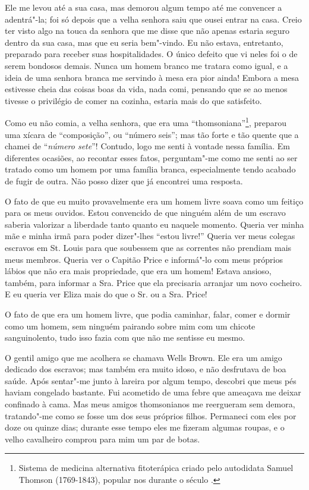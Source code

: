 Ele me levou até a sua casa, mas demorou algum tempo até me convencer a
adentrá"-la; foi só depois que a velha senhora saiu que ousei entrar na
casa. Creio ter visto algo na touca da senhora que me disse que não
apenas estaria seguro dentro da sua casa, mas que eu seria bem"-vindo. Eu
não estava, entretanto, preparado para receber suas hospitalidades. O
único defeito que vi neles foi o de serem bondosos demais. Nunca um
homem branco me tratara como igual, e a ideia de uma senhora branca me
servindo à mesa era pior ainda! Embora a mesa estivesse cheia das coisas
boas da vida, nada comi, pensando que se ao menos tivesse o privilégio
de comer na cozinha, estaria mais do que satisfeito.

Como eu não comia, a velha senhora, que era uma
``thomsoniana''\footnote{Sistema de medicina alternativa fitoterápica
  criado pelo autodidata Samuel Thomson (1769-1843), popular nos 
  durante o século .}, preparou uma xícara de ``composição'', ou
``número seis''; mas tão forte e tão quente que a chamei de
``\emph{número sete}''! Contudo, logo me senti à vontade nessa família.
Em diferentes ocasiões, ao recontar esses fatos, perguntam"-me como me
senti ao ser tratado como um homem por uma família branca, especialmente
tendo acabado de fugir de outra. Não posso dizer que já encontrei uma
resposta.

O fato de que eu muito provavelmente era um homem livre soava como um
feitiço para os meus ouvidos. Estou convencido de que ninguém além de um
escravo saberia valorizar a liberdade tanto quanto eu naquele momento.
Queria ver minha mãe e minha irmã para poder dizer"-lhes ``estou livre!''
Queria ver meus colegas escravos em St. Louis para que soubessem que as
correntes não prendiam mais meus membros. Queria ver o Capitão Price e
informá"-lo com meus próprios lábios que não era mais propriedade, que
era um homem! Estava ansioso, também, para informar a Sra. Price que ela
precisaria arranjar um novo cocheiro. E eu queria ver Eliza mais do que
o Sr. ou a Sra. Price!

O fato de que era um homem livre, que podia caminhar, falar, comer e
dormir como um homem, sem ninguém pairando sobre mim com um chicote
sanguinolento, tudo isso fazia com que não me sentisse eu mesmo.

O gentil amigo que me acolhera se chamava Wells Brown. Ele era um amigo
dedicado dos escravos; mas também era muito idoso, e não desfrutava de
boa saúde. Após sentar"-me junto à lareira por algum tempo, descobri que
meus pés haviam congelado bastante. Fui acometido de uma febre que
ameaçava me deixar confinado à cama. Mas meus amigos thomsonianos me
reergueram sem demora, tratando"-me como se fosse um dos seus próprios
filhos. Permaneci com eles por doze ou quinze dias; durante esse tempo
eles me fizeram algumas roupas, e o velho cavalheiro comprou para mim um
par de botas.


